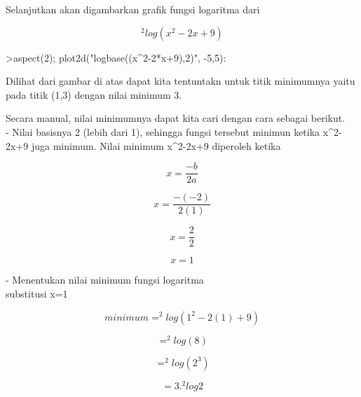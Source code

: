 \documentclass{article}
\begin{document}
\begin{eulernotebook}
\begin{eulercomment}
\begin{eulercomment}
\begin{eulercomment}
\begin{eulercomment}
\begin{eulercomment}
\begin{eulercomment}
\begin{eulercomment}
Selanjutkan akan digambarkan grafik fungsi logaritma dari\\
\end{eulercomment}
\begin{eulerformula}
\[
^2log(x^2-2x+9)
\]
\end{eulerformula}
\begin{eulerprompt}
>aspect(2); plot2d("logbase((x^2-2*x+9),2)", -5,5):
\end{eulerprompt}
\begin{eulercomment}
Dilihat dari gambar di atas dapat kita tentuntakn untuk titik
minimumnya yaitu pada titik (1,3) dengan nilai minimum 3.

Secara manual, nilai minimumnya dapat kita cari dengan cara sebagai
berikut.\\
- Nilai basisnya 2 (lebih dari 1), sehingga fungsi tersebut minimun
ketika x\textasciicircum{}2-2x+9 juga minimum. Nilai minimum x\textasciicircum{}2-2x+9 diperoleh ketika\\
\end{eulercomment}
\begin{eulerformula}
\[
x=\frac{-b}{2a}
\]
\end{eulerformula}
\begin{eulerformula}
\[
x=\frac{-(-2)}{2(1)}
\]
\end{eulerformula}
\begin{eulerformula}
\[
x=\frac{2}{2}
\]
\end{eulerformula}
\begin{eulerformula}
\[
x=1
\]
\end{eulerformula}
\begin{eulercomment}
- Menentukan nilai minimum fungsi logaritma\\
substitusi x=1\\
\end{eulercomment}
\begin{eulerformula}
\[
minimum=^2log(1^2-2(1)+9)
\]
\end{eulerformula}
\begin{eulerformula}
\[
= ^2log(8)
\]
\end{eulerformula}
\begin{eulerformula}
\[
= ^2log(2^3)
\]
\end{eulerformula}
\begin{eulerformula}
\[
= 3.^2log2
\]
\end{eulerformula}
\begin{eulerformula}

\end{eulerformula}
\end{eulercomment}
\end{eulercomment}
\end{eulercomment}
\end{eulercomment}
\end{eulercomment}
\end{eulercomment}
\end{eulernotebook}
\end{document}
